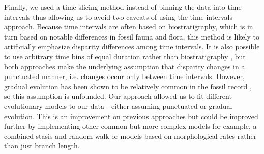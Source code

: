 \documentclass[12pt,letterpaper]{article}
\begin{document}
Finally, we used a time-slicing method instead of binning the data into time intervals \citep[e.g in:][]{cisneros2010,prentice2011,Hughes20082013,hopkinsdecoupling2013,bentonmodels2014,bensonfaunal2014} thus allowing us to avoid two caveats of using the time intervals approach.
Because time intervals are often based on biostratigraphy, which is in turn based on notable differences in fossil fauna and flora, this method is likely to artificially emphasize disparity differences among time intervals.
It is also possible to use arbitrary time bins of equal duration rather than biostratigraphy \citep{Butler2012,hopkinsdecoupling2013,bensonfaunal2014}, but both approaches make the underlying assumption that disparity changes in a punctuated  manner, i.e. changes occur only between time intervals.
However, gradual evolution has been shown to be relatively common in the fossil record \citep{Hunt20112007,Hunt21042015}, so this assumption is unfounded.
Our approach allowed us to fit different evolutionary models to our data - either assuming punctuated or gradual evolution.
This is an improvement on previous approaches but could be improved further by implementing other common but more complex models for example, a combined stasis and random walk \citep{Hunt21042015} or models based on morphological rates rather than just branch length.
\end{document}

